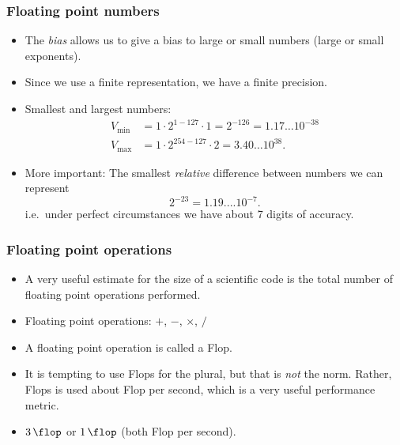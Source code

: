 \begin{frame}
  \frametitle{Floating point numbers}
  \begin{itemize}
  \item The \emph{bias} allows us to give a bias to large or small numbers
    (large or small exponents).
  \item Since we use a finite representation, we have a finite precision.
  \item Smallest and largest numbers:
    \begin{align*}
      V_\text{min} &= 1\cdot 2^{1-127}\cdot 1 = 2^{-126} = 1.17\ldots 10^{-38} \\
      V_\text{max} &= 1\cdot 2^{254-127}\cdot 2 = 3.40\ldots 10^{38}.
    \end{align*}
  \item More important: The smallest \emph{relative} difference between numbers
    we can represent
    \[
      2^{-23} = 1.19....10^{-7}.
    \]
    i.e.~under perfect circumstances we have about 7 digits of accuracy.
  \end{itemize}
\end{frame}

\begin{frame}
  \frametitle{Floating point operations}
  \begin{itemize}
    \item A very useful estimate for the size of a scientific code is the total
      number of floating point operations performed.
    \item Floating point operations: $+$, $-$, $\times$, $/$
    \item A floating point operation is called a Flop.
    \item It is tempting to use Flops for the plural, but that is \emph{not} the
      norm. Rather, Flops is used about Flop per second, which is a very useful
      performance metric.
    \item $\SI{3}{\flop}$ or $\SI{1}{\flop}$ (both Flop per second).
  \end{itemize}
\end{frame}

